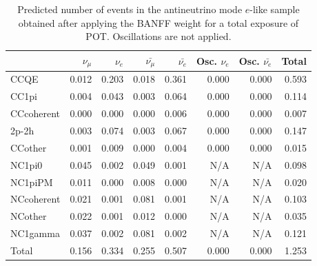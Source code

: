 
\begin{table}
\center
\begin{tabular} { | l ||r | r | r | r | r | r | | r | }
\hline
              & $\nu_\mu$            & $\nu_e$              & $\bar{\nu_\mu}$      & $\bar{\nu_e}$        & Osc. $\nu_e$         & Osc. $\bar{\nu_e}$   & Total                \\ \hline\hline
 CCQE         & 0.012                & 0.203                & 0.018                & 0.361                & 0.000                & 0.000                & 0.593                \\ \hline
 CC1pi        & 0.004                & 0.043                & 0.003                & 0.064                & 0.000                & 0.000                & 0.114                \\ \hline
 CCcoherent   & 0.000                & 0.000                & 0.000                & 0.006                & 0.000                & 0.000                & 0.007                \\ \hline
 2p-2h          & 0.003                & 0.074                & 0.003                & 0.067                & 0.000                & 0.000                & 0.147                \\ \hline
 CCother      & 0.001                & 0.009                & 0.000                & 0.004                & 0.000                & 0.000                & 0.015                \\ \hline
 NC1pi0       & 0.045                & 0.002                & 0.049                & 0.001                & N/A                  & N/A                  & 0.098                \\ \hline
 NC1piPM      & 0.011                & 0.000                & 0.008                & 0.000                & N/A                  & N/A                  & 0.020                \\ \hline
 NCcoherent   & 0.021                & 0.001                & 0.081                & 0.001                & N/A                  & N/A                  & 0.103                \\ \hline
 NCother      & 0.022                & 0.001                & 0.012                & 0.000                & N/A                  & N/A                  & 0.035                \\ \hline
 NC1gamma     & 0.037                & 0.002                & 0.081                & 0.002                & N/A                  & N/A                  & 0.121                \\ \hline
\hline
 Total        & 0.156                & 0.334                & 0.255                & 0.507                & 0.000                & 0.000                & 1.253                \\ \hline

\end{tabular}
\caption{
Predicted number of events in the antineutrino mode $e$-like sample
obtained after applying the BANFF weight
for a total exposure of \TotalPotNuBar{} POT.
Oscillations are not applied.
}
\label{tab:events_rhc1re_NoOsc}
\end{table}


